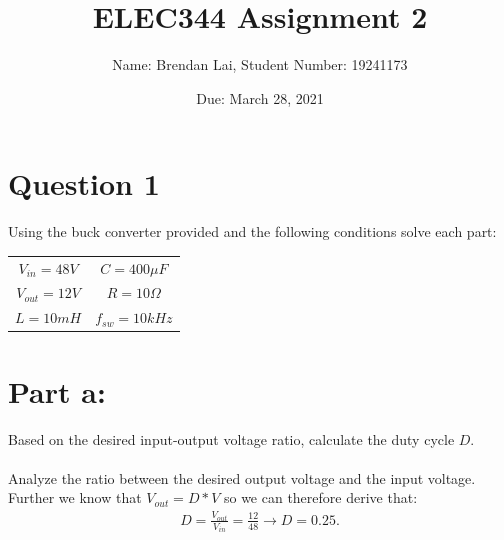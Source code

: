 \documentclass{article}
\title{ELEC344 Assignment 2}
\author{Name: Brendan Lai, Student Number: 19241173}
\date{Due: March 28, 2021}
\begin{document}
  
\maketitle
  
\tableofcontents

\section{Question 1}
Using the buck converter provided and the following conditions solve each part:
\begin{center}
\begin{tabular}{ c   c }
    $V_{in} = 48V$ & $C = 400 \mu F$\\ 
    $V_{out} = 12V$ &  $R = 10 \Omega$\\  
    $L = 10 mH$ & $f_{sw} = 10kHz$    
\end{tabular}
\end{center}

\section*{Part a:}
Based on the desired input-output voltage ratio, calculate the duty cycle $D$.\\
\\
Analyze the ratio between the desired output voltage and the input voltage. Further we know that $V_{out} = D *V$ so we can therefore derive that:\\
\begin{align*}
    D = \frac{V_{out}}{V_{in}} = \frac{12}{48} \xrightarrow[]{} D = 0.25. \\
\end{align*}
\end{document}
